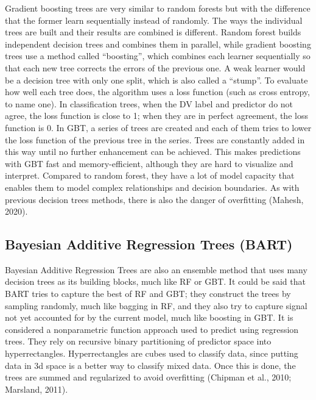 \documentclass[
  man]{apa7}
\begin{document}
Gradient boosting trees are very similar to random forests but with the difference that the former learn sequentially instead of randomly.
The ways the individual trees are built and their results are combined is different.
Random forest builds independent decision trees and combines them in parallel, while gradient boosting trees use a method called ``boosting'', which combines each learner sequentially so that each new tree corrects the errors of the previous one.
A weak learner would be a decision tree with only one split, which is also called a ``stump''.
To evaluate how well each tree does, the algorithm uses a loss function (such as cross entropy, to name one).
In classification trees, when the DV label and predictor do not agree, the loss function is close to 1; when they are in perfect agreement, the loss function is 0.
In GBT, a series of trees are created and each of them tries to lower the loss function of the previous tree in the series.
Trees are constantly added in this way until no further enhancement can be achieved.
This makes predictions with GBT fast and memory-efficient, although they are hard to visualize and interpret.
Compared to random forest, they have a lot of model capacity that enables them to model complex relationships and decision boundaries.
As with previous decision trees methods, there is also the danger of overfitting (Mahesh, 2020).

\hypertarget{bayesian-additive-regression-trees-bart}{%
\subsection{Bayesian Additive Regression Trees (BART)}\label{bayesian-additive-regression-trees-bart}}

Bayesian Additive Regression Trees are also an ensemble method that uses many decision trees as its building blocks, much like RF or GBT.
It could be said that BART tries to capture the best of RF and GBT; they construct the trees by sampling randomly, much like bagging in RF, and they also try to capture signal not yet accounted for by the current model, much like boosting in GBT.
It is considered a nonparametric function approach used to predict using regression trees.
They rely on recursive binary partitioning of predictor space into hyperrectangles.
Hyperrectangles are cubes used to classify data, since putting data in 3d space is a better way to classify mixed data.
Once this is done, the trees are summed and regularized to avoid overfitting (Chipman et al., 2010; Marsland, 2011).
\end{document}
